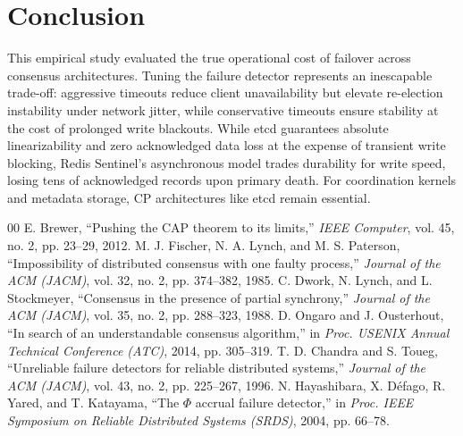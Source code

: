 \documentclass[conference]{IEEEtran}
\begin{document}
\section{Conclusion}
This empirical study evaluated the true operational cost of failover across consensus architectures. Tuning the failure detector represents an inescapable trade-off: aggressive timeouts reduce client unavailability but elevate re-election instability under network jitter, while conservative timeouts ensure stability at the cost of prolonged write blackouts. While etcd guarantees absolute linearizability and zero acknowledged data loss at the expense of transient write blocking, Redis Sentinel's asynchronous model trades durability for write speed, losing tens of acknowledged records upon primary death. For coordination kernels and metadata storage, CP architectures like etcd remain essential.

\begin{thebibliography}{00}
 E. Brewer, ``Pushing the CAP theorem to its limits,'' \emph{IEEE Computer}, vol. 45, no. 2, pp. 23--29, 2012.
 M. J. Fischer, N. A. Lynch, and M. S. Paterson, ``Impossibility of distributed consensus with one faulty process,'' \emph{Journal of the ACM (JACM)}, vol. 32, no. 2, pp. 374--382, 1985.
 C. Dwork, N. Lynch, and L. Stockmeyer, ``Consensus in the presence of partial synchrony,'' \emph{Journal of the ACM (JACM)}, vol. 35, no. 2, pp. 288--323, 1988.
 D. Ongaro and J. Ousterhout, ``In search of an understandable consensus algorithm,'' in \emph{Proc. USENIX Annual Technical Conference (ATC)}, 2014, pp. 305--319.
 T. D. Chandra and S. Toueg, ``Unreliable failure detectors for reliable distributed systems,'' \emph{Journal of the ACM (JACM)}, vol. 43, no. 2, pp. 225--267, 1996.
 N. Hayashibara, X. D{\'e}fago, R. Yared, and T. Katayama, ``The $\Phi$ accrual failure detector,'' in \emph{Proc. IEEE Symposium on Reliable Distributed Systems (SRDS)}, 2004, pp. 66--78.
\end{thebibliography}
\end{document}
